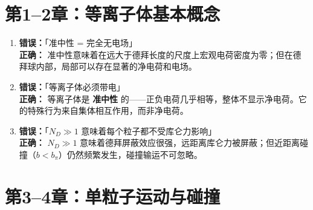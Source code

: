 \section{第1--2章：等离子体基本概念}

\begin{warning}
\begin{enumerate}
\item \textbf{错误：}「准中性 = 完全无电场」\\
\textbf{正确：} 准中性意味着在远大于德拜长度的尺度上宏观电荷密度为零；但在德拜球内部，局部可以存在显著的净电荷和电场。

\item \textbf{错误：}「等离子体必须带电」\\
\textbf{正确：} 等离子体是 \textbf{准中性} 的——正负电荷几乎相等，整体不显示净电荷。它的特殊行为来自集体相互作用，而非净电荷。

\item \textbf{错误：}「$N_D\gg 1$ 意味着每个粒子都不受库仑力影响」\\
\textbf{正确：} $N_D\gg 1$ 意味着德拜屏蔽效应很强，远距离库仑力被屏蔽；但近距离碰撞（$b<b_\pi$）仍然频繁发生，碰撞输运不可忽略。
\end{enumerate}
\end{warning}


\section{第3--4章：单粒子运动与碰撞}

